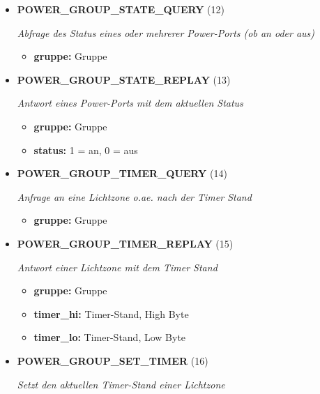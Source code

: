 \begin{itemize}
\item \textbf{POWER\_GROUP\_STATE\_QUERY} (12)

\textit{Abfrage des Status eines oder mehrerer Power-Ports (ob an oder aus)}

\small
\begin{itemize}
		
\item \textbf{gruppe:} Gruppe
\end{itemize}
\normalsize
	
\item \textbf{POWER\_GROUP\_STATE\_REPLAY} (13)

\textit{Antwort eines Power-Ports mit dem aktuellen Status}

\small
\begin{itemize}
		
\item \textbf{gruppe:} Gruppe
\item \textbf{status:} 1 = an, 0 = aus
\end{itemize}
\normalsize
	
\item \textbf{POWER\_GROUP\_TIMER\_QUERY} (14)

\textit{Anfrage an eine Lichtzone o.ae. nach der Timer Stand }

\small
\begin{itemize}
		
\item \textbf{gruppe:} Gruppe
\end{itemize}
\normalsize
	
\item \textbf{POWER\_GROUP\_TIMER\_REPLAY} (15)

\textit{Antwort einer Lichtzone mit dem Timer Stand }

\small
\begin{itemize}
		
\item \textbf{gruppe:} Gruppe
\item \textbf{timer\_hi:} Timer-Stand, High Byte
\item \textbf{timer\_lo:} Timer-Stand, Low Byte
\end{itemize}
\normalsize
	
\item \textbf{POWER\_GROUP\_SET\_TIMER} (16)

\textit{Setzt den aktuellen Timer-Stand einer Lichtzone}

\small
\begin{itemize}
		

\end{itemize}
\end{itemize}
